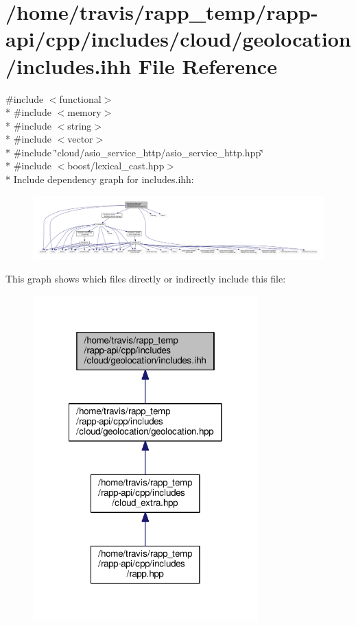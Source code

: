 \hypertarget{cloud_2geolocation_2includes_8ihh}{\section{/home/travis/rapp\-\_\-temp/rapp-\/api/cpp/includes/cloud/geolocation/includes.ihh File Reference}
\label{cloud_2geolocation_2includes_8ihh}
}
{\ttfamily \#include $<$functional$>$}\\*
{\ttfamily \#include $<$memory$>$}\\*
{\ttfamily \#include $<$string$>$}\\*
{\ttfamily \#include $<$vector$>$}\\*
{\ttfamily \#include \char`\"{}cloud/asio\-\_\-service\-\_\-http/asio\-\_\-service\-\_\-http.\-hpp\char`\"{}}\\*
{\ttfamily \#include $<$boost/lexical\-\_\-cast.\-hpp$>$}\\*
Include dependency graph for includes.\-ihh\-:
\nopagebreak
\begin{figure}[H]
\begin{center}
\leavevmode
\includegraphics[width=350pt]{cloud_2geolocation_2includes_8ihh__incl}
\end{center}
\end{figure}
This graph shows which files directly or indirectly include this file\-:
\nopagebreak
\begin{figure}[H]
\begin{center}
\leavevmode
\includegraphics[width=246pt]{cloud_2geolocation_2includes_8ihh__dep__incl}
\end{center}
\end{figure}
